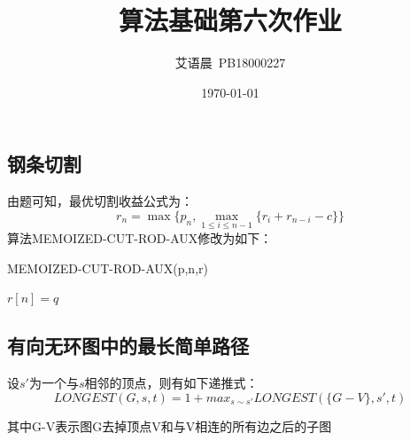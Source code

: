 \documentclass[]{report}
\title{算法基础第六次作业}
\author{艾语晨~PB18000227}
\date{\today}
\begin{document}
\theoremstyle{definition} \newtheorem{theorem}{Thm}[section] %
\theoremstyle{definition} \newtheorem{definition}{Def}[section] %
\theoremstyle{plain} \newtheorem{lemma}{lemma}[section] %

	\maketitle
	\newpage

	\tableofcontents
	\newpage

	\chapter{}
	\section{钢条切割}
	由题可知，最优切割收益公式为：
	\[r_n=\max\{p_n,\max_{1\le i\le n-1}\{r_i+r_{n-i}-c\}\}\]
	算法MEMOIZED-CUT-ROD-AUX修改为如下：
	\begin{algorithm}
		\caption{MEMOIZED-CUT-ROD-AUX(p,n,r)}
		$r[n]=q$\\
	\end{algorithm}
	\section{有向无环图中的最长简单路径}
	设$s'$为一个与$s$相邻的顶点，则有如下递推式：
	\[LONGEST(G,s,t) = 1 + max_{s\sim s'}{LONGEST(\{G-V\},s′,t)}\]\par
	其中{G-V}表示图G去掉顶点V和与V相连的所有边之后的子图\par
\end{document}

